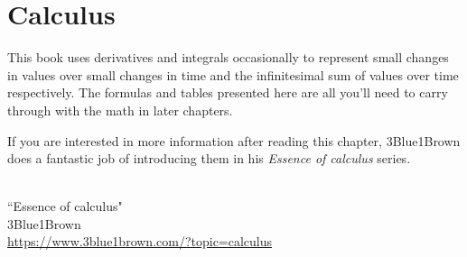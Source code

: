 
\chapter{Calculus}

This book uses derivatives and integrals occasionally to represent small changes
in values over small changes in time and the infinitesimal sum of values over
time respectively. The formulas and tables presented here are all you'll need to
carry through with the math in later chapters.

If you are interested in more information after reading this chapter,
3Blue1Brown does a fantastic job of introducing them in his \textit{Essence of
calculus} series.
\begin{bookfigure}
   \\
  ``Essence of calculus" \\
  \footnotesize 3Blue1Brown \\
  \url{https://www.3blue1brown.com/?topic=calculus}
\end{bookfigure}

\renewcommand*{\chapterpath}{\partpath/calculus}





